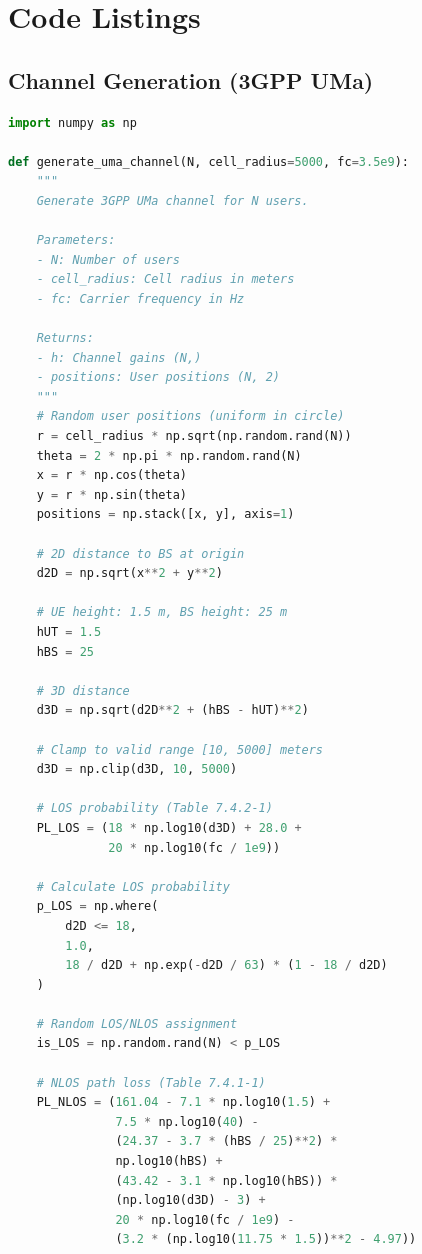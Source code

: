 \appendix

\chapter{Code Listings}
\label{app:code}

\section{Channel Generation (3GPP UMa)}

\begin{lstlisting}[language=Python, caption={3GPP TR 38.901 UMa Channel Model Implementation}]
import numpy as np

def generate_uma_channel(N, cell_radius=5000, fc=3.5e9):
    """
    Generate 3GPP UMa channel for N users.
    
    Parameters:
    - N: Number of users
    - cell_radius: Cell radius in meters
    - fc: Carrier frequency in Hz
    
    Returns:
    - h: Channel gains (N,)
    - positions: User positions (N, 2)
    """
    # Random user positions (uniform in circle)
    r = cell_radius * np.sqrt(np.random.rand(N))
    theta = 2 * np.pi * np.random.rand(N)
    x = r * np.cos(theta)
    y = r * np.sin(theta)
    positions = np.stack([x, y], axis=1)
    
    # 2D distance to BS at origin
    d2D = np.sqrt(x**2 + y**2)
    
    # UE height: 1.5 m, BS height: 25 m
    hUT = 1.5
    hBS = 25
    
    # 3D distance
    d3D = np.sqrt(d2D**2 + (hBS - hUT)**2)
    
    # Clamp to valid range [10, 5000] meters
    d3D = np.clip(d3D, 10, 5000)
    
    # LOS probability (Table 7.4.2-1)
    PL_LOS = (18 * np.log10(d3D) + 28.0 + 
              20 * np.log10(fc / 1e9))
    
    # Calculate LOS probability
    p_LOS = np.where(
        d2D <= 18,
        1.0,
        18 / d2D + np.exp(-d2D / 63) * (1 - 18 / d2D)
    )
    
    # Random LOS/NLOS assignment
    is_LOS = np.random.rand(N) < p_LOS
    
    # NLOS path loss (Table 7.4.1-1)
    PL_NLOS = (161.04 - 7.1 * np.log10(1.5) + 
               7.5 * np.log10(40) - 
               (24.37 - 3.7 * (hBS / 25)**2) * 
               np.log10(hBS) + 
               (43.42 - 3.1 * np.log10(hBS)) * 
               (np.log10(d3D) - 3) + 
               20 * np.log10(fc / 1e9) - 
               (3.2 * (np.log10(11.75 * 1.5))**2 - 4.97))
    

\end{lstlisting}
